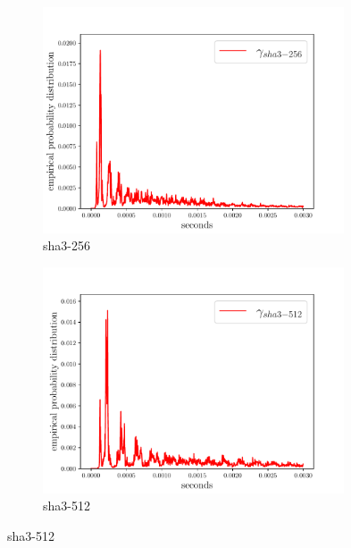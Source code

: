 \documentclass[12pt,a4paper,automark, toc=bib]{scrreprt}
\theoremstyle{definition}
\begin{document}
\begin{figure}
\begin{subfigure}{0.5\textwidth}
				\includegraphics[width=0.98\textwidth]{figures/_CC_compare_completeopenssl_sha3_256_cc_0_light.pdf}
				\caption{sha3-256}
			\end{subfigure}
			\begin{subfigure}{0.5\textwidth}
				\includegraphics[width=0.98\textwidth]{figures/_CC_compare_completeopenssl_sha3_512_cc_0_light.pdf}
				\caption{sha3-512}
			\end{subfigure}
		

\end{figure}
\end{document}
